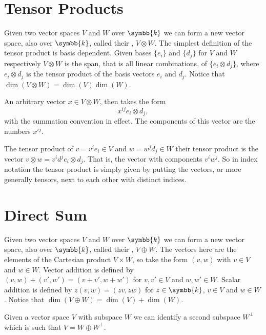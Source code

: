 \documentclass[fleqn]{NotesClass}
\renewcommand{\field}{\symbb{k}}
\begin{document}
\begin{appendices}
        \section{Tensor Products}
        Given two vector spaces \(V\) and \(W\) over \(\field\) we can form a new vector space, also over \(\field\), called their , \(V \otimes W\).
        The simplest definition of the tensor product is basis dependent.
        Given bases \(\{e_i\}\) and \(\{d_j\}\) for \(V\) and \(W\) respectively \(V \otimes W\) is the span, that is all linear combinations, of \(\{e_i \otimes d_j\}\), where \(e_i \otimes d_j\) is the tensor product of the basis vectors \(e_i\) and \(d_j\).
        Notice that \(\dim(V \otimes W) = \dim(V) \dim(W)\).
        
        An arbitrary vector \(x \in V \otimes W\), then takes the form
        \begin{equation}
            x^{ij}e_i \otimes d_j,
        \end{equation}
        with the summation convention in effect.
        The components of this vector are the numbers \(x^{ij}\).
        
        The tensor product of \(v = v^ie_i \in V\) and \(w = w^jd_j \in W\) their tensor product is the vector \(v \otimes w = v^id^j e_i \otimes d_j\).
        That is, the vector with components \(v^iw^j\).
        So in index notation the tensor product is simply given by putting the vectors, or more generally tensors, next to each other with distinct indices.
        
        \section{Direct Sum}
        Given two vector spaces \(V\) and \(W\) over \(\field\) we can form a new vector space, also over \(\field\), called their , \(V \oplus W\).
        The vectors here are the elements of the Cartesian product \(V \times W\), so take the form \((v, w)\) with \(v \in V\) and \(w \in W\).
        Vector addition is defined by \((v, w) + (v', w') = (v + v', w + w')\) for \(v, v' \in V\) and \(w, w' \in W\).
        Scalar addition is defined by \(z(v, w) = (zv, zw)\) for \(z \in \field\), \(v \in V\) and \(w \in W\).
        Notice that \(\dim(V \oplus W) = \dim(V) + \dim(W)\).
        
        Given a vector space \(V\) with subspace \(W\) we can identify a second subspace \(W^{\perp}\) which is such that \(V = W \oplus W^{\perp}\).
        

\end{appendices}
\end{document}
